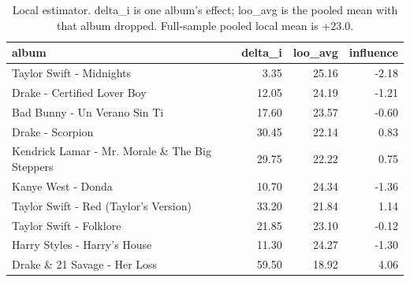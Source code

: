 \begin{table}
\caption{Local estimator. delta\_i is one album's effect; loo\_avg is the pooled mean with that album dropped. Full-sample pooled local mean is +23.0.}
\begin{tabular}{lrrr}
\toprule
album & delta\_i & loo\_avg & influence \\
\midrule
Taylor Swift - Midnights & 3.35 & 25.16 & -2.18 \\
Drake - Certified Lover Boy & 12.05 & 24.19 & -1.21 \\
Bad Bunny - Un Verano Sin Ti & 17.60 & 23.57 & -0.60 \\
Drake - Scorpion & 30.45 & 22.14 & 0.83 \\
Kendrick Lamar - Mr. Morale \& The Big Steppers & 29.75 & 22.22 & 0.75 \\
Kanye West - Donda & 10.70 & 24.34 & -1.36 \\
Taylor Swift - Red (Taylor's Version) & 33.20 & 21.84 & 1.14 \\
Taylor Swift - Folklore & 21.85 & 23.10 & -0.12 \\
Harry Styles - Harry's House & 11.30 & 24.27 & -1.30 \\
Drake \& 21 Savage - Her Loss & 59.50 & 18.92 & 4.06 \\
\bottomrule
\end{tabular}
\end{table}
